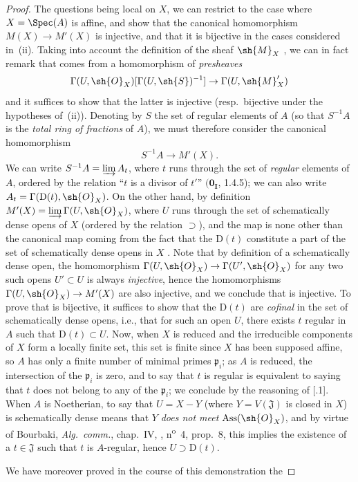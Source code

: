 \begin{proof}
The questions being local on $X$, we can restrict to the case where $X=\Spec(A)$ is affine, and show that the canonical homomorphism $M(X)\to M'(X)$ is injective, and that it is bijective in the cases considered in~(ii).
Taking into account the definition of the sheaf $\sh{M}_X$ , we can in fact remark that  comes from a homomorphism of \emph{presheaves}
\[
  \Gamma(U,\sh{O}_X)[\Gamma(U,\sh{S})^{-1}]\to\Gamma(U,\sh{M}'_X)
\]
and it suffices to show that the latter is injective (resp.\ bijective under the hypotheses of~(ii)).
Denoting by $S$ the set of regular elements of $A$ (so that $S^{-1}A$ is the \emph{total ring of fractions} of $A$), we must therefore consider the canonical homomorphism
\[
\label{IV.20.2.11.1}
  S^{-1}A\to M'(X).
  \tag{20.2.11.1}
\]
We can write $S^{-1}A=\varinjlim A_t$, where $t$ runs through the set of \emph{regular} elements of $A$, ordered by the relation ``$t$ is a divisor of $t'$'' $(\mathbf{0_I}$, 1.4.5);
we can also write $A_t=\Gamma(\mathrm{D}(t),\sh{O}_X)$.
On the other hand, by definition $M'(X)=\varinjlim\Gamma(U,\sh{O}_X)$, where $U$ runs through the set of schematically dense opens of $X$ (ordered by the relation $\supset$), and the map  is none other than the canonical map coming from the fact that the $\mathrm{D}(t)$ constitute a part of the set of schematically dense opens in $X$ .
Note that by definition of a schematically dense open, the homomorphism $\Gamma(U,\sh{O}_X)\to\Gamma(U',\sh{O}_X)$ for any two such opens $U'\subset U$ is always \emph{injective}, hence the homomorphisms $\Gamma(U,\sh{O}_X)\to M'(X)$ are also injective, and we conclude that  is injective.
To prove that  is bijective, it suffices to show that the $\mathrm{D}(t)$ are \emph{cofinal} in the set of schematically dense opens, i.e., that for such an open $U$, there exists $t$ regular in $A$ such that $\mathrm{D}(t)\subset U$.
Now, when $X$ is reduced and the irreducible components of $X$ form a locally finite set, this set is finite since $X$ has been supposed affine, so $A$ has only a finite number of minimal primes $\mathfrak{p}_i$;
as $A$ is reduced, the intersection of the $\mathfrak{p}_i$ is zero, and to say that $t$ is regular is equivalent to saying that $t$ does not belong to any of the $\mathfrak{p}_i$;
we conclude by the reasoning of [.1].
When $A$ is Noetherian, to say that $U=X-Y$ (where $Y=V(\mathfrak{J})$ is closed in $X$) is schematically dense means  that $Y$ \emph{does not meet} $\operatorname{Ass}(\sh{O}_X)$, and by virtue of Bourbaki, \emph{Alg.~comm.}, chap.~IV, , n\textsuperscript{o}~4, prop.~8, this implies the existence of a $t\in\mathfrak{J}$ such that $t$ is $A$-regular, hence $U\supset\mathrm{D}(t)$.

We have moreover proved in the course of this demonstration the
\end{proof}

